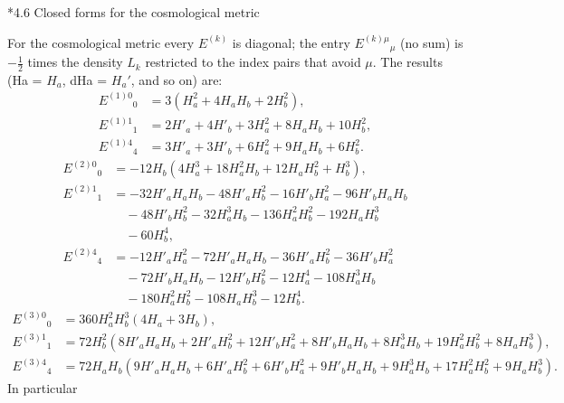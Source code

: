 \documentclass[10pt,a4paper]{article}
\makeatletter
\renewcommand\subsection{\@startsection{subsection}{2}{\z@}{-3.25ex\@plus -1ex \@minus -.2ex}{1.5ex \@plus .2ex}{\normalfont\large\bfseries\raggedright}}
\makeatother
\begin{document}
\subsection*{4.6 Closed forms for the cosmological metric}
For the cosmological metric every $E^{(k)}$ is diagonal; the entry $E^{(k)\mu}{}_\mu$ (no sum) is $-\tfrac12$ times the density $L_k$ restricted to the index pairs that avoid $\mu$. The results (Ha = $H_a$, dHa = $H_a'$, and so on) are:
\begin{align*}
E^{(1)0}{}_0&=3 \left(H_{a}^{2} + 4 H_{a} H_{b} + 2 H_{b}^{2}\right), \\
E^{(1)1}{}_1&=2 H'_{a} + 4 H'_{b} + 3 H_{a}^{2} + 8 H_{a} H_{b} + 10 H_{b}^{2}, \\
E^{(1)4}{}_4&=3 H'_{a} + 3 H'_{b} + 6 H_{a}^{2} + 9 H_{a} H_{b} + 6 H_{b}^{2}.
\end{align*}
\begin{align*}
E^{(2)0}{}_0&=- 12 H_{b} \left(4 H_{a}^{3} + 18 H_{a}^{2} H_{b} + 12 H_{a} H_{b}^{2} + H_{b}^{3}\right), \\
E^{(2)1}{}_1&=- 32 H'_{a} H_{a} H_{b} - 48 H'_{a} H_{b}^{2} - 16 H'_{b} H_{a}^{2} - 96 H'_{b} H_{a} H_{b} \\
&\quad - 48 H'_{b} H_{b}^{2} - 32 H_{a}^{3} H_{b} - 136 H_{a}^{2} H_{b}^{2} - 192 H_{a} H_{b}^{3} \\
&\quad - 60 H_{b}^{4}, \\
E^{(2)4}{}_4&=- 12 H'_{a} H_{a}^{2} - 72 H'_{a} H_{a} H_{b} - 36 H'_{a} H_{b}^{2} - 36 H'_{b} H_{a}^{2} \\
&\quad - 72 H'_{b} H_{a} H_{b} - 12 H'_{b} H_{b}^{2} - 12 H_{a}^{4} - 108 H_{a}^{3} H_{b} \\
&\quad - 180 H_{a}^{2} H_{b}^{2} - 108 H_{a} H_{b}^{3} - 12 H_{b}^{4}.
\end{align*}
\begin{align*}
E^{(3)0}{}_0&=360 H_{a}^{2} H_{b}^{3} \left(4 H_{a} + 3 H_{b}\right), \\
E^{(3)1}{}_1&=72 H_{b}^{2} \left(8 H'_{a} H_{a} H_{b} + 2 H'_{a} H_{b}^{2} + 12 H'_{b} H_{a}^{2} + 8 H'_{b} H_{a} H_{b} + 8 H_{a}^{3} H_{b} + 19 H_{a}^{2} H_{b}^{2} + 8 H_{a} H_{b}^{3}\right), \\
E^{(3)4}{}_4&=72 H_{a} H_{b} \left(9 H'_{a} H_{a} H_{b} + 6 H'_{a} H_{b}^{2} + 6 H'_{b} H_{a}^{2} + 9 H'_{b} H_{a} H_{b} + 9 H_{a}^{3} H_{b} + 17 H_{a}^{2} H_{b}^{2} + 9 H_{a} H_{b}^{3}\right).
\end{align*}
In particular
\end{document}
